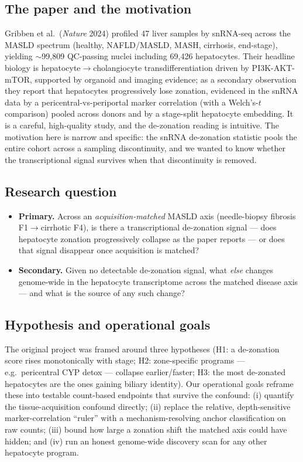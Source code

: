 \documentclass[11pt,a4paper]{article}
\begin{document}
\subsection{The paper and the motivation}

Gribben et al.\ (\emph{Nature} 2024) profiled 47 liver samples by snRNA-seq across the MASLD spectrum (healthy, NAFLD/MASLD, MASH, cirrhosis, end-stage), yielding $\sim$99{,}809 QC-passing nuclei including 69{,}426 hepatocytes. Their headline biology is hepatocyte$\to$cholangiocyte transdifferentiation driven by PI3K-AKT-mTOR, supported by organoid and imaging evidence; as a secondary observation they report that hepatocytes progressively lose zonation, evidenced in the snRNA data by a pericentral-vs-periportal marker correlation (with a Welch's-$t$ comparison) pooled across donors and by a stage-split hepatocyte embedding. It is a careful, high-quality study, and the de-zonation reading is intuitive. The motivation here is narrow and specific: the snRNA de-zonation statistic pools the entire cohort across a sampling discontinuity, and we wanted to know whether the transcriptional signal survives when that discontinuity is removed.

\subsection{Research question}

\begin{itemize}[leftmargin=1.4em]
  \item \textbf{Primary.} Across an \emph{acquisition-matched} MASLD axis (needle-biopsy fibrosis F1$\to$cirrhotic F4), is there a transcriptional de-zonation signal --- does hepatocyte zonation progressively collapse as the paper reports --- or does that signal disappear once acquisition is matched?
  \item \textbf{Secondary.} Given no detectable de-zonation signal, what \emph{else} changes genome-wide in the hepatocyte transcriptome across the matched disease axis --- and what is the source of any such change?
\end{itemize}

\subsection{Hypothesis and operational goals}

The original project was framed around three hypotheses (H1: a de-zonation score rises monotonically with stage; H2: zone-specific programs --- e.g.\ pericentral CYP detox --- collapse earlier/faster; H3: the most de-zonated hepatocytes are the ones gaining biliary identity). Our operational goals reframe these into testable count-based endpoints that survive the confound: (i) quantify the tissue-acquisition confound directly; (ii) replace the relative, depth-sensitive marker-correlation ``ruler'' with a mechanism-resolving anchor classification on raw counts; (iii) bound how large a zonation shift the matched axis could have hidden; and (iv) run an honest genome-wide discovery scan for any other hepatocyte program.
\end{document}
